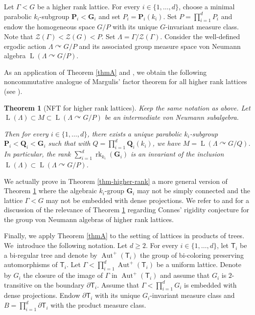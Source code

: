 \documentclass[11pt]{article}
\newcommand{\bG}{\boldsymbol{G}}
\newcommand{\bP}{\boldsymbol{P}}
\newcommand{\bQ}{\boldsymbol{Q}}
\newtheorem{letterthm}{Theorem}
\theoremstyle{definition}
\DeclareMathOperator{\Aut}{Aut}
\DeclareMathOperator{\rk}{rk}
\DeclareMathOperator{\rL}{L}
\begin{document}
Let $\Gamma < G$ be a higher rank lattice. For every $i \in \{1, \dots, d\}$, choose a minimal parabolic $k_i$-subgroup $\bP_i < \bG_i$ and set $P_i = \bP_i(k_i)$. Set $P = \prod_{i = 1}^d P_i$ and endow the homogeneous space $G/P$ with its unique $G$-invariant measure class. Note that $\mathscr Z(\Gamma) < \mathscr Z(G) < P$. Set $\Lambda = \Gamma/\mathscr Z(\Gamma)$. Consider the well-defined ergodic action $\Lambda \curvearrowright G/P$ and its associated group measure space von Neumann algebra $\rL(\Lambda \curvearrowright G/P)$.

As an application of Theorem \ref{thmA} and \cite[Th.\,D]{BBH21}, we obtain the following noncommutative analogue of Margulis'\! factor theorem for all higher rank lattices (see \cite[Th.\,IV.2.11]{Ma91}).

\begin{letterthm}[NFT for higher rank lattices]\label{thmB}
Keep the same notation as above. Let $\rL(\Lambda) \subset M \subset \rL(\Lambda \curvearrowright G/P)$ be an intermediate von Neumann subalgebra.

Then for every $i \in \{1, \dots, d\}$, there exists a unique parabolic $k_i$-subgroup $\bP_i < \bQ_i < \bG_i$ such that with $Q = \prod_{i = 1}^d \bQ_i(k_i)$, we have $M = \rL(\Lambda \curvearrowright G/Q)$. In particular, the rank $\sum_{i = 1}^d \rk_{k_i}(\bG_i)$ is an invariant of the inclusion $\rL(\Lambda) \subset \rL(\Lambda \curvearrowright G/P)$.
\end{letterthm}

We actually prove in Theorem \ref{thm-higher-rank} a more general version of Theorem \ref{thmB} where the algebraic $k_i$-group $\bG_i$ may not be simply connected and the lattice $\Gamma < G$ may not be embedded with dense projections. We refer to \cite[\S 6]{BBH21} and \cite[\S 5]{Ho21} for a discussion of the relevance of Theorem \ref{thmB} regarding Connes'\! rigidity conjecture for the group von Neumann algebras of higher rank lattices.

Finally, we apply Theorem \ref{thmA} to the setting of lattices in products of trees. We~introduce the following notation. Let $d\geq 2$. For every $i \in \{1, \dots, d\}$, let $\mathsf T_i$ be a bi-regular tree and denote by $\Aut^+(\mathsf T_i)$ the group of bi-coloring preserving automorphisms of $\mathsf T_i$. Let $\Gamma < \prod_{i = 1}^d \Aut^+(\mathsf T_i)$ be a uniform lattice. Denote by $G_i$ the closure of the image of $\Gamma$ in $\Aut^+(\mathsf T_i)$ and assume that $G_i$ is $2$-transitive on the boundary $\partial \mathsf T_i$. Assume that $\Gamma < \prod_{i = 1}^d G_i$ is embedded with dense projections. Endow $\partial \mathsf T_i$ with its unique $G_i$-invariant measure class and $B = \prod_{i = 1}^d \partial \mathsf T_i$ with the product measure class.
\end{document}
